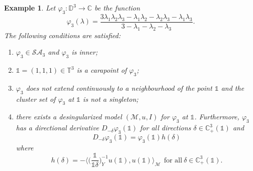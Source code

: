\documentclass[11pt, reqno]{amsart}
\newtheorem{example}[theorem]{Example}
\newcommand\1{\boldsymbol {1}}
\numberwithin{equation}{section}
\begin{document}
\begin{example}\label{ddimensionalexample}
    Let $\varphi_3:\mathbb{D}^{3}\rightarrow \mathbb{C}$ be the function
\begin{equation}\label{kneesefunction}
    \varphi_3(\lambda) = \dfrac{3\lambda_{1}\lambda_{2}\lambda_{3}-\lambda_{1}\lambda_{2}-\lambda_{2}\lambda_{3}-\lambda_{1}\lambda_{3}}{3-\lambda_{1}-\lambda_{2}-\lambda_{3}}.
\end{equation}
The following conditions are satisfied:
    \begin{enumerate}
    \item $\varphi_3\in\mathcal{SA}_{3}$ and  $\varphi_3$ is inner;
\item $\mathds{1}=(1,1,1)\in\mathbb{T}^{3}$ is a carapoint of $\varphi_3$;
\item $\varphi_3$ does not extend continuously to a neighbourhood of the point $\mathds{1}$ and the cluster set of 
$\varphi_3$ at  $\mathds{1}$ is not a singleton;
\item there exists a desingularized model $(\mathcal{M},u, I)$ for $\varphi_3$ at $\mathds{1}$. Furthermore, $\varphi_3$ has a directional derivative $D_{-\delta}\varphi_3(\mathds{1})$ for all directions $\delta\in\mathbb{C}^{3}_{+}(\mathds{1})$ and
$$D_{-\delta}\varphi_3(\mathds{1}) = \varphi_3(\mathds{1})h(\delta)$$
where 
$$ h(\delta) = -\bigg\langle \bigg(\dfrac{\mathds{1}}{\mathds{1} \delta}\bigg)_{Y}^{-1}u(\mathds{1}),u(\mathds{1})\bigg\rangle_{\mathcal{M}}~~\text{for all}~ \delta\in\mathbb{C}_{+}^{3}(\mathds{1}).$$
    \end{enumerate}
\end{example}
\end{document}
